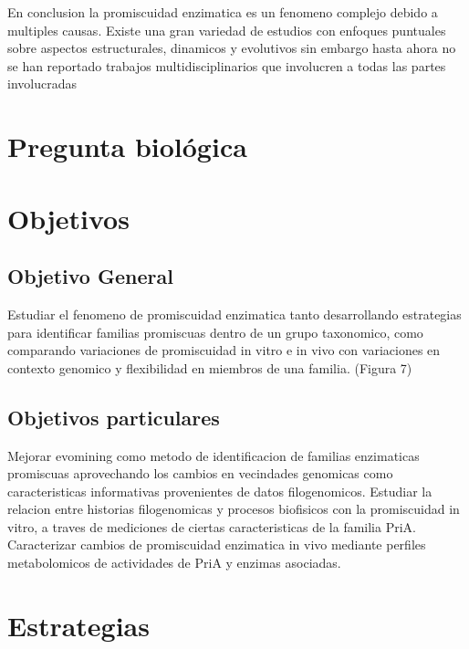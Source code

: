 \documentclass[12pt,twoside]{reedthesis}
\begin{document}
  En conclusion la promiscuidad enzimatica es un fenomeno complejo debido
  a multiples causas. Existe una gran variedad de estudios con enfoques
  puntuales sobre aspectos estructurales, dinamicos y evolutivos sin
  embargo hasta ahora no se han reportado trabajos multidisciplinarios que
  involucren a todas las partes involucradas
  
  \clearpage  
  
  \chapter*{Pregunta biológica}\label{pregunta-biologica}
  
  \clearpage  
  
  \chapter*{Objetivos}\label{objetivos}
  
  \section{Objetivo General}\label{objetivo-general}
  
  Estudiar el fenomeno de promiscuidad enzimatica tanto desarrollando
  estrategias para identificar familias promiscuas dentro de un grupo
  taxonomico, como comparando variaciones de promiscuidad in vitro e in
  vivo con variaciones en contexto genomico y flexibilidad en miembros de
  una familia. (Figura 7)
  
  \section{Objetivos particulares}\label{objetivos-particulares}
  
  Mejorar evomining como metodo de identificacion de familias enzimaticas
  promiscuas aprovechando los cambios en vecindades genomicas como
  caracteristicas informativas provenientes de datos filogenomicos.
  Estudiar la relacion entre historias filogenomicas y procesos biofisicos
  con la promiscuidad in vitro, a traves de mediciones de ciertas
  caracteristicas de la familia PriA. Caracterizar cambios de promiscuidad
  enzimatica in vivo mediante perfiles metabolomicos de actividades de
  PriA y enzimas asociadas.
  
  \clearpage  
  
  \chapter*{Estrategias}\label{estrategias}
  
\end{document}
